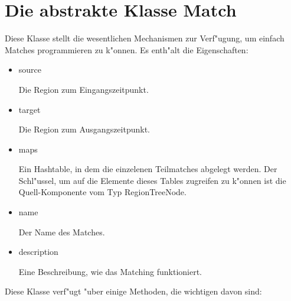 \documentclass[a4paper,10pt,twoside]{scrreprt}
\begin{document}
\section{Die abstrakte Klasse Match}
Diese Klasse stellt die wesentlichen Mechanismen zur Verf"ugung, um einfach Matches programmieren zu k"onnen. Es enth"alt die Eigenschaften:
\begin{itemize}
\item source

Die Region zum Eingangszeitpunkt.

\item target

Die Region zum Ausgangszeitpunkt.

\item maps

Ein Hashtable, in dem die einzelenen Teilmatches abgelegt werden. Der Schl"ussel, um auf die Elemente dieses Tables zugreifen zu k"onnen ist die Quell-Komponente vom Typ RegionTreeNode.

\item name

Der Name des Matches.

\item description

Eine Beschreibung, wie das Matching funktioniert.
\end{itemize} 

Diese Klasse verf"ugt "uber einige Methoden, die wichtigen davon  sind:
\end{document}
